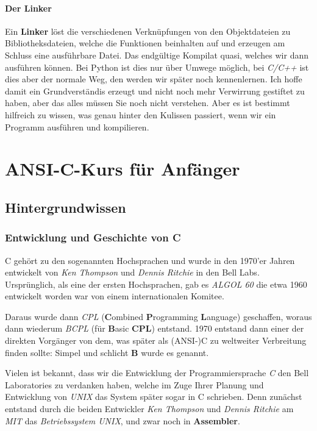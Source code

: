 \documentclass[b5paper,10pt,dvips,fleqn,titlepage,twoside]{book}
\begin{document}
\subsection{Der Linker}
Ein \textbf{Linker} löst die verschiedenen Verknüpfungen von den Objektdateien zu Bibliotheksdateien, welche die Funktionen beinhalten auf und erzeugen am Schluss eine ausführbare Datei. Das endgültige Kompilat quasi, welches wir dann ausführen können. Bei Python ist dies nur über Umwege möglich, bei \emph{C/C++} ist dies aber der normale Weg, den werden wir später noch kennenlernen.
\newline
Ich hoffe damit ein Grundverständis erzeugt und nicht noch mehr Verwirrung gestiftet zu haben, aber das alles müssen Sie noch nicht verstehen. Aber es ist bestimmt hilfreich zu wissen, was genau hinter den Kulissen passiert, wenn wir ein Programm ausführen und kompilieren.
\part{ANSI-C-Kurs für Anfänger}
\label{part:ansic}
\chapter{Hintergrundwissen}
\section{Entwicklung und Geschichte von C}
C gehört zu den sogenannten Hochsprachen und wurde in den 1970'er Jahren entwickelt von \emph{Ken Thompson} und \emph{Dennis Ritchie} in den Bell Labs. Ursprünglich, als eine der ersten Hochsprachen, gab es \emph{ALGOL 60} die etwa 1960 entwickelt worden war von einem internationalen Komitee.

Daraus wurde dann \emph{CPL} (\textbf{C}ombined \textbf{P}rogramming \textbf{L}anguage) geschaffen, woraus dann wiederum \emph{BCPL} (für \textbf{B}asic \textbf{CPL}) entstand. 1970 entstand dann einer der direkten Vorgänger von dem, was später als (ANSI-)C zu weltweiter Verbreitung finden sollte: Simpel und schlicht \textbf{B} wurde es genannt.

Vielen ist bekannt, dass wir die Entwicklung der Programmiersprache \emph{C} den Bell Laboratories zu verdanken haben, welche im Zuge Ihrer Planung und Entwicklung von \emph{UNIX} das System später sogar in C schrieben.
Denn zunächst entstand durch die beiden Entwickler \emph{Ken Thompson} und \emph{Dennis Ritchie} am \emph{MIT} das \emph{Betriebssystem UNIX}, und zwar noch in \textbf{Assembler}.
\newline
\end{document}

